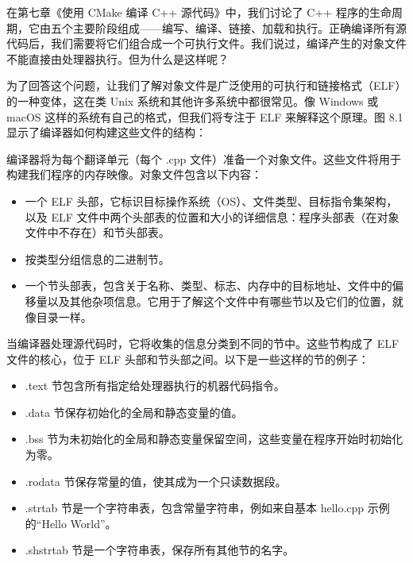 在第七章《使用 CMake 编译 C++ 源代码》中，我们讨论了 C++ 程序的生命周期，它由五个主要阶段组成——编写、编译、链接、加载和执行。正确编译所有源代码后，我们需要将它们组合成一个可执行文件。我们说过，编译产生的对象文件不能直接由处理器执行。但为什么是这样呢？

为了回答这个问题，让我们了解对象文件是广泛使用的可执行和链接格式（ELF）的一种变体，这在类 Unix 系统和其他许多系统中都很常见。像 Windows 或 macOS 这样的系统有自己的格式，但我们将专注于 ELF 来解释这个原理。图 8.1 显示了编译器如何构建这些文件的结构：


编译器将为每个翻译单元（每个 .cpp 文件）准备一个对象文件。这些文件将用于构建我们程序的内存映像。对象文件包含以下内容：

\begin{itemize}
\item
一个 ELF 头部，它标识目标操作系统（OS）、文件类型、目标指令集架构，以及 ELF 文件中两个头部表的位置和大小的详细信息：程序头部表（在对象文件中不存在）和节头部表。

\item
按类型分组信息的二进制节。

\item
一个节头部表，包含关于名称、类型、标志、内存中的目标地址、文件中的偏移量以及其他杂项信息。它用于了解这个文件中有哪些节以及它们的位置，就像目录一样。
\end{itemize}

当编译器处理源代码时，它将收集的信息分类到不同的节中。这些节构成了 ELF 文件的核心，位于 ELF 头部和节头部之间。以下是一些这样的节的例子：

\begin{itemize}
\item
.text 节包含所有指定给处理器执行的机器代码指令。

\item
.data 节保存初始化的全局和静态变量的值。

\item
.bss 节为未初始化的全局和静态变量保留空间，这些变量在程序开始时初始化为零。

\item
.rodata 节保存常量的值，使其成为一个只读数据段。

\item
.strtab 节是一个字符串表，包含常量字符串，例如来自基本 hello.cpp 示例的“Hello World”。

\item
.shstrtab 节是一个字符串表，保存所有其他节的名字。
\end{itemize}


